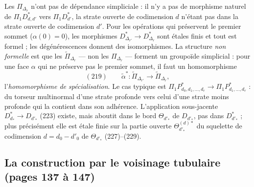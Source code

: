 \documentclass[11pt,a4paper]{article}
\begin{document}
Les $\Pi_{\Delta_r}$ n'ont pas de dépendance simpliciale : il n'y a pas de
morphisme naturel de $\Pi_1 D^{*}_{d,d'}$ vers $\Pi_1 D^{*}_{d'}$, la strate
ouverte de codimension $d$ n'étant pas dans la strate ouverte de codimension
$d'$. Pour les opérations qui préservent le premier sommet ($\alpha(0) = 0$),
les morphismes $D^{*}_{\Delta_{r'}} \to D^{*}_{\Delta_r}$ sont étales finis et
tout est formel ; les dégénérescences donnent des isomorphismes. La structure
\emph{non formelle} est que les $\widetilde{\Pi}_{\Delta_r}$ — non les
$\Pi_{\Delta_r}$ — forment un groupoïde simplicial : pour une face $\alpha$ qui ne
préserve pas le premier sommet, il faut un homomorphisme
\[
(219) \qquad \widetilde{\alpha}^* : \widetilde{\Pi}_{\Delta_{r'}} \longrightarrow
\widetilde{\Pi}_{\Delta_r},
\]
l'\emph{homomorphisme de spécialisation}. Le cas typique est $\Pi_1 P^{*}_{d_0,
d_1, \dots, d_r} \to \Pi_1 P^{*}_{d_1, \dots, d_r}$ : du torseur multinormal d'une
strate profonde vers celui d'une strate moins profonde qui la contient dans son
adhérence. L'application sous-jacente $D^{*}_{d_*} \to D_{d'_*}$ (223) existe,
mais aboutit dans le bord $\Theta_{d'_*}$ de $D_{d'_*}$, pas dans $D^{*}_{d'_*}$ ;
plus précisément elle est étale finie sur la partie ouverte $\Theta^{(d)*}_{d'_*}$
du squelette de codimension $d = d_0 - d'_0$ de $\Theta_{d'_*}$ (227)--(229).

\subsection*{La construction par le voisinage tubulaire (pages 137 à 147)}
\end{document}

